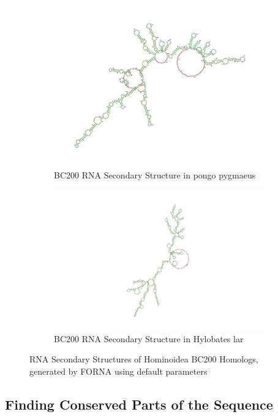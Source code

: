 \documentclass[conference, 11pt]{IEEEtran}
\begin{document}
\begin{figure}[h]
\begin{subfigure}[b]{0.4\textwidth}
    \includegraphics[width=\textwidth]{figs/rnapongo.png}
    \caption{BC200 RNA Secondary Structure in pongo pygmaeus}
    \label{fig:pongo-structure}
  \end{subfigure}
  \hfill
  \begin{subfigure}[b]{0.4\textwidth}   
    \centering
    \includegraphics[width=\textwidth]{figs/rnahylobates.png}
    \caption{BC200 RNA Secondary Structure in Hylobates lar}
    \label{fig:hylobates-structure}
  \end{subfigure}
  \caption{RNA Secondary Structures of Hominoidea BC200 Homologs, generated by FORNA \cite{kerpedjiev2015forna} using default parameters}
  \label{fig:rna-sec-structure}
\end{figure}

\subsection{Finding Conserved Parts of the Sequence}
\end{document}
